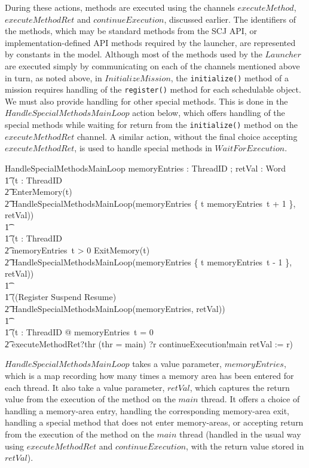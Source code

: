 During these actions, methods are executed using the channels
$executeMethod$, $executeMethodRet$ and $continueExecution$, discussed
earlier.
The identifiers of the methods, which may be standard methods from the
SCJ API, or implementation-defined API methods required by the
launcher, are represented by constants in the model.
Although most of the methods used by the $Launcher$ are executed
simply by communicating on each of the channels mentioned above in
turn, as noted above, in $InitializeMission$, the
\texttt{initialize()} method of a mission requires handling of the
\texttt{register()} method for each schedulable object.
We must also provide handling for other special methods.
This is done in the $HandleSpecialMethodsMainLoop$ action below, which
offers handling of the special methods while waiting for return from
the \texttt{initialize()} method on the $executeMethodRet$ channel.
A similar action, without the final choice accepting
$executeMethodRet$, is used to handle special methods in
$WaitForExecution$.
\begin{circusaction}
  HandleSpecialMethodsMainLoop \circdef \circval memoryEntries : ThreadID \fun \nat; \circres retVal : Word \circspot \\
  \t1 (\Extchoice t : ThreadID \circspot \\
  \t2 EnterMemory(t) \circseq \\
  \t2 HandleSpecialMethodsMainLoop(memoryEntries \oplus \{ t \mapsto memoryEntries~t + 1 \}, retVal)) \\
  \t1 {} \extchoice {} \\
  \t1 (\Extchoice t : ThreadID \circspot \\
  \t2 \lcircguard memoryEntries~t > 0 \rcircguard \circguard ExitMemory(t) \circseq \\
  \t2 HandleSpecialMethodsMainLoop(memoryEntries \oplus \{ t \mapsto memoryEntries~t - 1 \}, retVal)) \\
  \t1 {} \extchoice {} \\
  \t1 ((Register \extchoice Suspend \extchoice Resume) \circseq \\
  \t2 HandleSpecialMethodsMainLoop(memoryEntries, retVal)) \\
  \t1 {} \extchoice {} \\
  \t1 (\lcircguard \forall t : ThreadID @ memoryEntries~t = 0 \rcircguard \circguard {} \\
  \t2 executeMethodRet?thr \prefixcolon (thr = main) ?r \then continueExecution!main \then retVal := r)
\end{circusaction}
$HandleSpecialMethodsMainLoop$ takes a value parameter,
$memoryEntries$, which is a map recording how many times a memory area
has been entered for each thread.
It also take a value parameter, $retVal$, which captures the return
value from the execution of the method on the $main$ thread.
It offers a choice of handling a memory-area entry, handling the
corresponding memory-area exit, handling a special method that does
not enter memory-areas, or accepting return from the execution of the
method on the $main$ thread (handled in the usual way using
$executeMethodRet$ and $continueExecution$, with the return value
stored in $retVal$).

